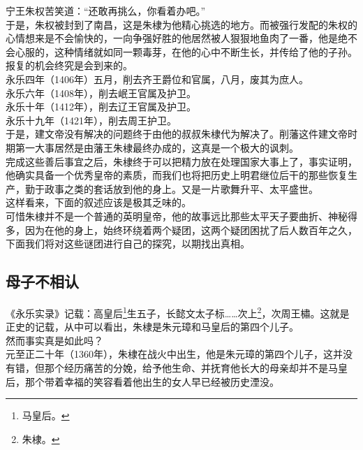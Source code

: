\begin{multicols}{\theparacolNo}
宁王朱权苦笑道：“还敢再挑么，你看着办吧。”\\

于是，朱权被封到了南昌，这是朱棣为他精心挑选的地方。而被强行发配的朱权的心情想来是不会愉快的，一向争强好胜的他居然被人狠狠地鱼肉了一番，他是绝不会心服的，这种情绪就如同一颗毒芽，在他的心中不断生长，并传给了他的子孙。\\

报复的机会终究是会到来的。\\

永乐四年（1406年）五月，削去齐王爵位和官属，八月，废其为庶人。\\

永乐六年（1408年），削去岷王官属及护卫。\\

永乐十年（1412年），削去辽王官属及护卫。\\

永乐十九年（1421年），削去周王护卫。\\

于是，建文帝没有解决的问题终于由他的叔叔朱棣代为解决了。削藩这件建文帝时期第一大事居然是由藩王朱棣最终办成的，这真是一个极大的讽刺。\\

完成这些善后事宜之后，朱棣终于可以把精力放在处理国家大事上了，事实证明，他确实具备一个优秀皇帝的素质，而我们也将把历史上明君继位后干的那些恢复生产，勤于政事之类的套话放到他的身上。又是一片歌舞升平、太平盛世。\\

这样看来，下面的叙述应该是极其乏味的。\\

可惜朱棣并不是一个普通的英明皇帝，他的故事远比那些太平天子要曲折、神秘得多，因为在他的身上，始终环绕着两个疑团，这两个疑团困扰了后人数百年之久，下面我们将对这些谜团进行自己的探究，以期找出真相。\\

\subsection{母子不相认}
《永乐实录》记载：高皇后\footnote{马皇后。}生五子，长懿文太子标……次上\footnote{朱棣。}，次周王橚。这就是正史的记载，从中可以看出，朱棣是朱元璋和马皇后的第四个儿子。\\

然而事实真是如此吗？\\

元至正二十年（1360年），朱棣在战火中出生，他是朱元璋的第四个儿子，这并没有错，但那个经历痛苦的分娩，给予他生命、并抚育他长大的母亲却并不是马皇后，那个带着幸福的笑容看着他出生的女人早已经被历史湮没。\\


\end{multicols}
